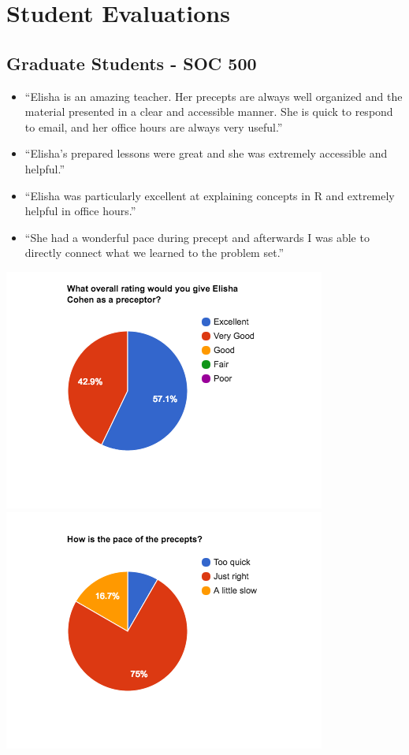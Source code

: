 \documentclass[11pt,a4paper,sans]{moderncv}
\begin{document}
\section{Student Evaluations}
\subsection{Graduate Students - SOC 500}
\begin{itemize}
	\item ``Elisha is an amazing teacher. Her precepts are always well organized and the material presented in a clear and accessible manner. She is quick to respond to email, and her office hours are always very useful.''
	\item ``Elisha's prepared lessons were great and she was extremely accessible and helpful.''
	\item ``Elisha was particularly excellent at explaining concepts in R and extremely helpful in office hours.''
	\item ``She had a wonderful pace during precept and afterwards I was able to directly connect what we learned to the problem set.''
\end{itemize}
\includegraphics[scale=0.45]{Soc500chart1.png}
\includegraphics[scale=0.45]{Soc500chart2.png}
\end{document}

